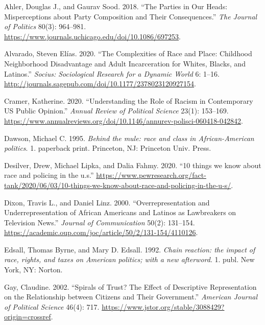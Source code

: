 \documentclass[
  12pt,
]{article}
\newlength{\cslhangindent}
\newlength{\cslentryspacingunit} %
\newenvironment{CSLReferences}[2] %
 {%
  \setlength{\parindent}{0pt}
  \ifodd #1
  \let\oldpar\par
  \def\par{\hangindent=\cslhangindent\oldpar}
  \fi
  \setlength{\parskip}{#2\cslentryspacingunit}
 }%
 {}
\begin{document}
\hypertarget{refs}{}
\begin{CSLReferences}{1}{0}
\leavevmode{}%
Ahler, Douglas J., and Gaurav Sood. 2018. {``The Parties in Our Heads:
Misperceptions about Party Composition and Their Consequences.''}
\emph{The Journal of Politics} 80(3): 964--981.
\url{https://www.journals.uchicago.edu/doi/10.1086/697253}.

\leavevmode{}%
Alvarado, Steven Elías. 2020. {``The Complexities of Race and Place:
Childhood Neighborhood Disadvantage and Adult Incarceration for Whites,
Blacks, and Latinos.''} \emph{Socius: Sociological Research for a
Dynamic World} 6: 1--16.
\url{http://journals.sagepub.com/doi/10.1177/2378023120927154}.

\leavevmode{}%
Cramer, Katherine. 2020. {``Understanding the Role of Racism in
Contemporary US Public Opinion.''} \emph{Annual Review of Political
Science} 23(1): 153--169.
\url{https://www.annualreviews.org/doi/10.1146/annurev-polisci-060418-042842}.

\leavevmode{}%
Dawson, Michael C. 1995. \emph{Behind the mule: race and class in
African-American politics}. 1. paperback print. Princeton, NJ: Princeton
Univ. Press.

\leavevmode{}%
Desilver, Drew, Michael Lipka, and Dalia Fahmy. 2020. {``10 things we
know about race and policing in the u.s.''}
\url{https://www.pewresearch.org/fact-tank/2020/06/03/10-things-we-know-about-race-and-policing-in-the-u-s/}.

\leavevmode{}%
Dixon, Travis L., and Daniel Linz. 2000. {``Overrepresentation and
Underrepresentation of African Americans and Latinos as Lawbreakers on
Television News.''} \emph{Journal of Communication} 50(2): 131--154.
\url{https://academic.oup.com/joc/article/50/2/131-154/4110126}.

\leavevmode{}%
Edsall, Thomas Byrne, and Mary D. Edsall. 1992. \emph{Chain reaction:
the impact of race, rights, and taxes on American politics; with a new
afterword}. 1. publ. New York, NY: Norton.

\leavevmode{}%
Gay, Claudine. 2002. {``Spirals of Trust? The Effect of Descriptive
Representation on the Relationship between Citizens and Their
Government.''} \emph{American Journal of Political Science} 46(4): 717.
\url{https://www.jstor.org/stable/3088429?origin=crossref}.


\end{CSLReferences}
\end{document}
